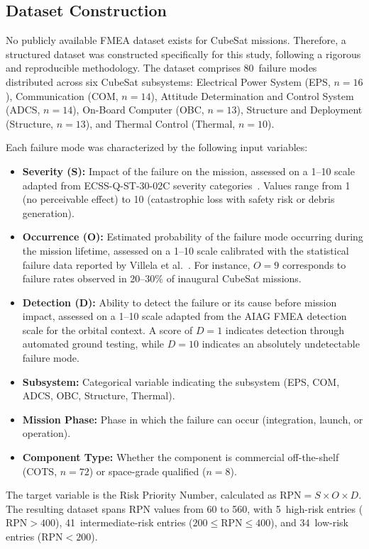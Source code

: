 \subsection{Dataset Construction}
\label{subsec:dataset}

No publicly available FMEA dataset exists for CubeSat missions. Therefore, a structured dataset was constructed specifically for this study, following a rigorous and reproducible methodology. The dataset comprises 80~failure modes distributed across six CubeSat subsystems: Electrical Power System (EPS, $n=16$), Communication (COM, $n=14$), Attitude Determination and Control System (ADCS, $n=14$), On-Board Computer (OBC, $n=13$), Structure and Deployment (Structure, $n=13$), and Thermal Control (Thermal, $n=10$).

Each failure mode was characterized by the following input variables:
\begin{itemize}
\item \textbf{Severity (S):} Impact of the failure on the mission, assessed on a 1--10 scale adapted from ECSS-Q-ST-30-02C severity categories~\cite{bouwmeester2022improving}. Values range from 1 (no perceivable effect) to 10 (catastrophic loss with safety risk or debris generation).
\item \textbf{Occurrence (O):} Estimated probability of the failure mode occurring during the mission lifetime, assessed on a 1--10 scale calibrated with the statistical failure data reported by Villela et al.~\cite{villela2019towards}. For instance, $O=9$ corresponds to failure rates observed in 20--30\% of inaugural CubeSat missions.
\item \textbf{Detection (D):} Ability to detect the failure or its cause before mission impact, assessed on a 1--10 scale adapted from the AIAG FMEA detection scale for the orbital context. A score of $D=1$ indicates detection through automated ground testing, while $D=10$ indicates an absolutely undetectable failure mode.
\item \textbf{Subsystem:} Categorical variable indicating the subsystem (EPS, COM, ADCS, OBC, Structure, Thermal).
\item \textbf{Mission Phase:} Phase in which the failure can occur (integration, launch, or operation).
\item \textbf{Component Type:} Whether the component is commercial off-the-shelf (COTS, $n=72$) or space-grade qualified ($n=8$).
\end{itemize}

The target variable is the Risk Priority Number, calculated as $\text{RPN} = S \times O \times D$. The resulting dataset spans RPN values from 60 to 560, with 5~high-risk entries ($\text{RPN} > 400$), 41~intermediate-risk entries ($200 \leq \text{RPN} \leq 400$), and 34~low-risk entries ($\text{RPN} < 200$).

